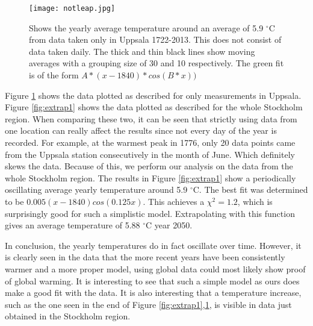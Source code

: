 \begin{figure}[h!]
\begin{center}
\texttt{[image: notleap.jpg]}
\caption{\label{fig:extrap2}Shows the yearly average temperature around an average of 5.9 $^{\circ}$C from data taken only in Uppsala 1722-2013. This does not consist of data taken daily. The thick and thin black lines show moving averages with a grouping size of 30 and 10 respectively. The green fit is of the form $A*(x-1840)*cos(B*x))$}
\end{center}
\end{figure}

Figure \ref{fig:extrap2} shows the data plotted as described for only measurements in Uppsala. Figure \ref{fig:extrap1} shows the data plotted as described for the whole Stockholm region. When comparing these two, it can be seen that strictly using data from one location can really affect the results since not every day of the year is recorded. For example, at the warmest peak in 1776, only 20 data points came from the Uppsala station consecutively in the month of June. Which definitely skews the data. Because of this, we perform our analysis on the data from the whole Stockholm region. The results in Figure \ref{fig:extrap1} show a periodically oscillating average yearly temperature around 5.9 $^{\circ}$C. The best fit was determined to be $0.005(x-1840)cos(0.125x)$. This achieves a $\chi ^2=1.2$, which is surprisingly good for such a simplistic model. Extrapolating with this function gives an average temperature of 5.88 $^{\circ}$C year 2050. 

In conclusion, the yearly temperatures do in fact oscillate over time. However, it is clearly seen in the data that the more recent years have been consistently warmer and a more proper model, using global data could most likely show proof of global warming. It is interesting to see that such a simple model as ours does make a good fit with the data. It is also interesting that a temperature increase, such as the one seen in the end of Figure \ref{fig:extrap1},\ref{fig:extrap2}, is visible in data just obtained in the Stockholm region.





